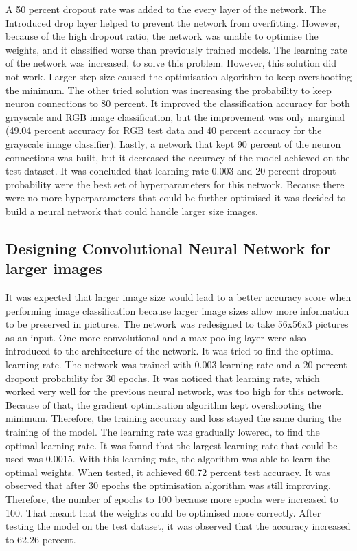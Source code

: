 A 50 percent dropout rate was added to the every layer of the network. The Introduced drop layer helped to prevent the network from overfitting. However, because of the high dropout ratio, the network was unable to optimise the weights, and it classified worse than previously trained models. The learning rate of the network was increased, to solve this problem. However, this solution did not work. Larger step size caused the optimisation algorithm to keep overshooting the minimum. The other tried solution was increasing the probability to keep neuron connections to 80 percent. It improved the classification accuracy for both grayscale and RGB image classification, but the improvement was only marginal (49.04 percent accuracy for RGB test data and 40 percent accuracy for the grayscale image classifier). Lastly, a network that kept 90 percent of the neuron connections was built, but it decreased the accuracy of the model achieved on the test dataset. It was concluded that learning rate 0.003 and 20 percent dropout probability were the best set of hyperparameters for this network. Because there were no more hyperparameters that could be further optimised it was decided to build a neural network that could handle larger size images.


\subsection{Designing Convolutional Neural Network  for larger images}

It was expected that larger image size would lead to a better accuracy score when performing image classification because larger image sizes allow more information to be preserved in pictures. The network was redesigned to take 56x56x3 pictures as an input. One more convolutional and a max-pooling layer were also introduced to the architecture of the network. It was tried to find the optimal learning rate. The network was trained with 0.003 learning rate and a 20 percent dropout probability for 30 epochs. It was noticed that learning rate, which worked very well for the previous neural network, was too high for this network. Because of that, the gradient optimisation algorithm kept overshooting the minimum. Therefore, the training accuracy and loss stayed the same during the training of the model. The learning rate was gradually lowered, to find the optimal learning rate.  It was found that the largest learning rate that could be used was 0.0015. With this learning rate, the algorithm was able to learn the optimal weights. When tested, it achieved 60.72 percent test accuracy. It was observed that after 30 epochs the optimisation algorithm was still improving. Therefore,  the number of epochs to 100 because more epochs were increased to 100.  That meant that the weights could be optimised more correctly. After testing the model on the test dataset, it was observed that the accuracy increased to 62.26 percent.

